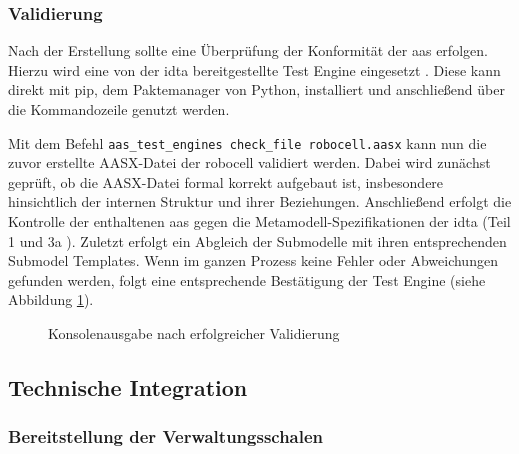 \subsubsection{Validierung}
Nach der Erstellung sollte eine Überprüfung der Konformität der \acs{aas} erfolgen.
Hierzu wird eine von der \acs{idta} bereitgestellte Test Engine eingesetzt \cite{TestEngine}. 
Diese kann direkt mit pip, dem Paktemanager von Python, installiert und anschließend über die Kommandozeile genutzt werden.

Mit dem Befehl \texttt{aas\_test\_engines check\_file robocell.aasx} kann nun die zuvor erstellte AASX-Datei der robocell validiert werden.
Dabei wird zunächst geprüft, ob die AASX-Datei formal korrekt aufgebaut ist, insbesondere hinsichtlich der internen Struktur und ihrer Beziehungen.
Anschließend erfolgt die Kontrolle der enthaltenen \acs{aas} gegen die Metamodell-Spezifikationen der \acs{idta} (Teil 1 \cite{SpezifikationPart1} und 3a \cite{SpezifikationPart3a}).
Zuletzt erfolgt ein Abgleich der Submodelle mit ihren entsprechenden Submodel Templates.
Wenn im ganzen Prozess keine Fehler oder Abweichungen gefunden werden, folgt eine entsprechende Bestätigung der Test Engine (siehe Abbildung \ref{fig:KonsolenausgabeTestEngine}).

\setlength{\fboxsep}{0pt}
\begin{figure}[htbp]
    \centering
    \caption{Konsolenausgabe nach erfolgreicher Validierung}
    \label{fig:KonsolenausgabeTestEngine}
\end{figure}

\subsection{Technische Integration}
\subsubsection{Bereitstellung der Verwaltungsschalen}
